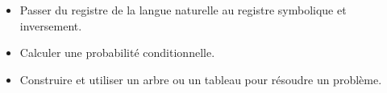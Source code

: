 \documentclass[12pt]{article}
\theoremstyle{break}
\begin{document}
\begin{savoir}{}{}
\begin{itemize}
  \item Passer du registre de la langue naturelle au registre symbolique et inversement.
  \item Calculer une probabilité conditionnelle.
  \item Construire et utiliser un arbre ou un tableau pour résoudre un problème.
\end{itemize}
\end{savoir}
\end{document}
